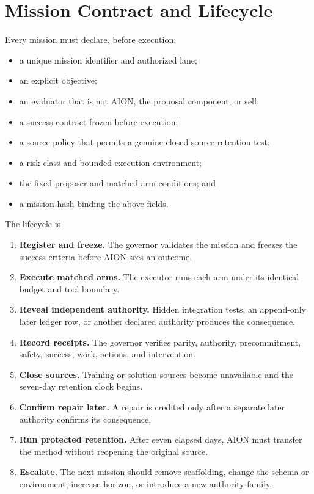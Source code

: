 \documentclass[11pt,a4paper]{article}
\begin{document}
\section{Mission Contract and Lifecycle}
\label{sec:mission-lifecycle}

Every mission must declare, before execution:
\begin{itemize}
    \item a unique mission identifier and authorized lane;
    \item an explicit objective;
    \item an evaluator that is not AION, the proposal component, or self;
    \item a success contract frozen before execution;
    \item a source policy that permits a genuine closed-source retention test;
    \item a risk class and bounded execution environment;
    \item the fixed proposer and matched arm conditions; and
    \item a mission hash binding the above fields.
\end{itemize}

The lifecycle is
\begin{enumerate}
    \item \textbf{Register and freeze.}  The governor validates the mission and
          freezes the success criteria before AION sees an outcome.
    \item \textbf{Execute matched arms.}  The executor runs each arm under its
          identical budget and tool boundary.
    \item \textbf{Reveal independent authority.}  Hidden integration tests,
          an append-only later ledger row, or another declared authority
          produces the consequence.
    \item \textbf{Record receipts.}  The governor verifies parity, authority,
          precommitment, safety, success, work, actions, and intervention.
    \item \textbf{Close sources.}  Training or solution sources become
          unavailable and the seven-day retention clock begins.
    \item \textbf{Confirm repair later.}  A repair is credited only after a
          separate later authority confirms its consequence.
    \item \textbf{Run protected retention.}  After seven elapsed days, AION
          must transfer the method without reopening the original source.
    \item \textbf{Escalate.}  The next mission should remove scaffolding,
          change the schema or environment, increase horizon, or introduce a
          new authority family.
\end{enumerate}
\end{document}
